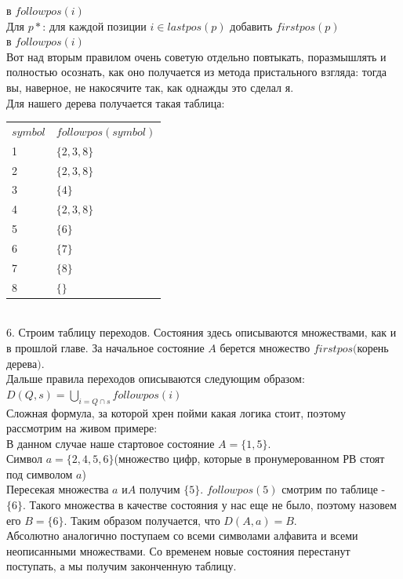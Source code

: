 \documentclass[14pt]{extreport}
\begin{document}
	в $followpos(i)$\\
	\hspace*{30pt}Для  $p*$: для каждой позиции $i \in lastpos(p)$ добавить $firstpos(p)$\\
	\hspace*{30pt}в $followpos(i)$\\
	Вот над вторым правилом очень советую отдельно повтыкать, поразмышлять и полностью осознать,
	как оно получается из метода пристального взгляда: тогда вы, наверное, не накосячите так,
	как однажды это сделал я.\\
	Для нашего дерева получается такая таблица:\\
		\begin{tabular}{ll}
			 $symbol$ & $followpos(symbol)$ \\
			 1 & $\{2, 3, 8\}$ \\
			 2 & $\{2, 3, 8\}$ \\
			 3 & $\{4\}$ \\
			 4 & $\{2, 3, 8\}$ \\
			 5 & $\{6\}$ \\
			 6 & $\{7\}$\\
			 7 & $\{8\}$\\
			 8 & $\{\}$\\
		\end{tabular}\\
	6. Строим таблицу переходов. Состояния здесь описываются множествами, как и в прошлой главе.
	За начальное состояние $A$ берется множество $firstpos($корень дерева$)$.\\
	Дальше правила переходов описываются следующим образом:\\
	$D(Q, s) = \bigcup\limits_{i=Q \cap s}followpos(i)$\\
	Сложная формула, за которой хрен пойми какая логика стоит, поэтому рассмотрим на живом
	примере:\\
	В данном случае наше стартовое состояние $A=\{1, 5\}$.\\
	Символ $a=\{2, 4, 5, 6\}$(множество	цифр, которые в пронумерованном РВ 
	стоят под символом $a$)\\
	Пересекая множества $a$ и$A$ получим $\{5\}$. $followpos(5)$ смотрим по таблице -
	$\{6\}$. Такого множества в качестве состояния у нас еще не было, поэтому назовем его
	$B=\{6\}$. Таким образом получается, что $D(A, a) = B$.\\
	Абсолютно аналогично поступаем со всеми символами алфавита и всеми неописанными множествами.
	Со временем новые состояния перестанут поступать, а мы получим законченную таблицу.\\
\end{document}
